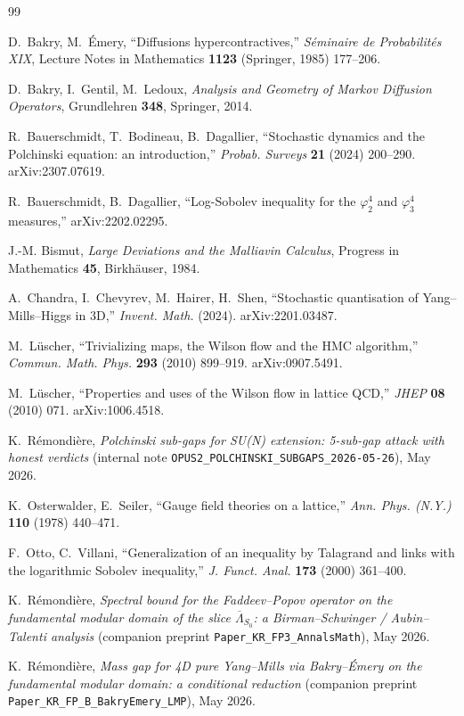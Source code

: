 \documentclass[11pt,a4paper]{amsart}
\theoremstyle{definition}
\begin{document}
\begin{thebibliography}{99}

D.~Bakry, M.~\'Emery,
``Diffusions hypercontractives,''
\emph{S\'eminaire de Probabilit\'es XIX},
Lecture Notes in Mathematics \textbf{1123} (Springer, 1985) 177--206.

D.~Bakry, I.~Gentil, M.~Ledoux,
\emph{Analysis and Geometry of Markov Diffusion Operators},
Grundlehren \textbf{348}, Springer, 2014.

R.~Bauerschmidt, T.~Bodineau, B.~Dagallier,
``Stochastic dynamics and the Polchinski equation: an introduction,''
\emph{Probab. Surveys} \textbf{21} (2024) 200--290.
arXiv:2307.07619.

R.~Bauerschmidt, B.~Dagallier,
``Log-Sobolev inequality for the $\varphi^4_2$ and $\varphi^4_3$ measures,''
arXiv:2202.02295.

J.-M. Bismut,
\emph{Large Deviations and the Malliavin Calculus},
Progress in Mathematics \textbf{45}, Birkh\"auser, 1984.

A.~Chandra, I.~Chevyrev, M.~Hairer, H.~Shen,
``Stochastic quantisation of Yang--Mills--Higgs in 3D,''
\emph{Invent. Math.} (2024).
arXiv:2201.03487.

M.~L\"uscher,
``Trivializing maps, the Wilson flow and the HMC algorithm,''
\emph{Commun. Math. Phys.} \textbf{293} (2010) 899--919.
arXiv:0907.5491.

M.~L\"uscher,
``Properties and uses of the Wilson flow in lattice QCD,''
\emph{JHEP} \textbf{08} (2010) 071.
arXiv:1006.4518.

K.~R\'emondi\`ere,
\emph{Polchinski sub-gaps for SU(N) extension: 5-sub-gap attack with
honest verdicts} (internal note
\texttt{OPUS2\_POLCHINSKI\_SUBGAPS\_2026-05-26}), May 2026.

K.~Osterwalder, E.~Seiler,
``Gauge field theories on a lattice,''
\emph{Ann. Phys. (N.Y.)} \textbf{110} (1978) 440--471.

F.~Otto, C.~Villani,
``Generalization of an inequality by Talagrand and links with the
logarithmic Sobolev inequality,''
\emph{J. Funct. Anal.} \textbf{173} (2000) 361--400.

K.~R\'emondi\`ere,
\emph{Spectral bound for the Faddeev--Popov operator on the fundamental
modular domain of the slice $\overline\Lambda_{S_0}$: a Birman--Schwinger /
Aubin--Talenti analysis} (companion preprint
\texttt{Paper\_KR\_FP3\_AnnalsMath}), May 2026.

K.~R\'emondi\`ere,
\emph{Mass gap for 4D pure Yang--Mills via Bakry--\'Emery on the
fundamental modular domain: a conditional reduction} (companion preprint
\texttt{Paper\_KR\_FP\_B\_BakryEmery\_LMP}), May 2026.

\end{thebibliography}
\end{document}
